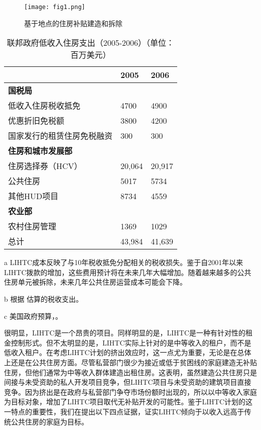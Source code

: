 \documentclass[lang=cn,11pt,a4paper]{paper}
\begin{document}
\begin{figure}[h]
	\centering
	\texttt{[image: fig1.png]}
	\caption{基于地点的住房补贴建造和拆除}\label{fig1}
\end{figure}

\renewcommand\arraystretch{0.9}
\begin{table}[h]
  \centering
  \setlength{\tabcolsep}{12mm}
    \begin{threeparttable}
    \caption{联邦政府低收入住房支出（2005-2006）（单位：百万美元）\!\!}\label{tab2}
      \begin{tabular}{lll}
        \toprule
        & 2005 & 2006 \\
        \midrule
        \textbf{国税局}\tnote{b} & & \\
        低收入住房税收抵免 & 4700 & 4900 \\
        优惠折旧免税额 & 3800 & 4200 \\
        国家发行的租赁住房免税融资 & 300 &
        300 \\[5pt]
        \textbf{住房和城市发展部}\tnote{c} & & \\
        住房选择券（HCV） & 20,064 & 20,917 \\
        公共住房 & 5017 & 5734 \\
        其他HUD项目 & 8734 & 4559 \\[5pt]
        \textbf{农业部}\tnote{c} & & \\
        农村住房管理 & 1369 & 1029 \\
        总计 & 43,984 & 41,639 \\
        \bottomrule
      \end{tabular}
    \begin{tablenotes}
      \footnotesize
      \item[a] LIHTC成本反映了与10年税收抵免分配相关的税收损失。鉴于自2001年以来LIHTC拨款的增加，这些费用预计将在未来几年大幅增加。随着越来越多的公共住房单元被拆除，未来几年公共住房运营成本可能会下降。
      \item[b] 根据 \cite{USCongress2005} 估算的税收支出。
      \item[c] 美国政府预算，\cite{Budget2006}。
    \end{tablenotes}
  \end{threeparttable}
  \end{table}

很明显，LIHTC是一个昂贵的项目。同样明显的是，LIHTC是一种有针对性的租金控制形式。但不太明显的是，LIHTC实际上针对的是中等收入的租户，而不是低收入租户。在考虑LIHTC计划的挤出效应时，这一点尤为重要，无论是在总体上还是在公共住房方面。尽管私营部门很少为接近或低于贫困线的家庭建造无补贴住房，但他们通常为中等收入群体建造出租住房。这表明，虽然建造公共住房只是间接与未受资助的私人开发项目竞争，但LIHTC项目与未受资助的建筑项目直接竞争。因为挤出是在政府与私营部门争夺市场份额时出现的，所以以中等收入家庭为目标对象，增加了LIHTC项目取代无补贴开发的可能性。鉴于LIHTC计划的这一特点的重要性，我们在提出以下四点证据，证实LIHTC倾向于以收入远高于传统公共住房的家庭为目标。
\end{document}
